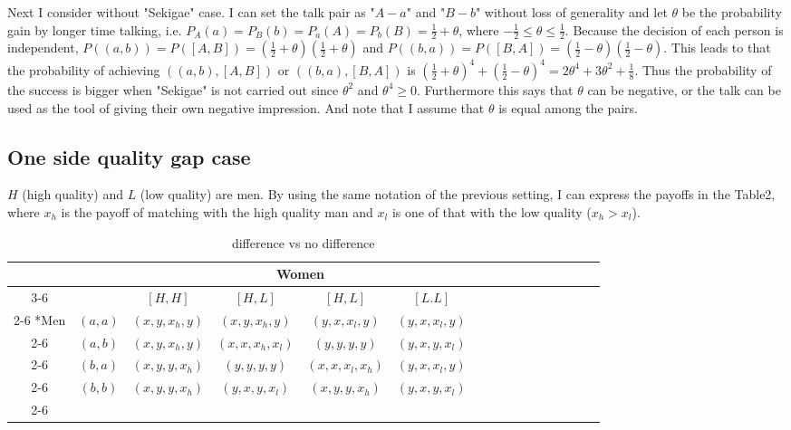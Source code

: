 \documentclass{article}
\begin{document}
	\par
	Next I consider without "Sekigae" case. I can set the talk pair as "$A - a$" and "$B - b$" without loss of generality and let $\theta$ be the probability gain by longer time talking, i.e. $P_A(a)= P_B(b) = P_a(A) = P_b(B) = \frac{1}{2} + \theta$, where $-\frac{1}{2} \leq\theta \leq \frac{1}{2}$. Because the decision of each person is independent, $P((a,b)) = P([A, B]) = \left( \frac{1}{2} + \theta \right) \left( \frac{1}{2} + \theta\right)$ and $P((b, a)) = P([B, A]) =  \left( \frac{1}{2} - \theta \right) \left( \frac{1}{2} - \theta\right)$. This leads to that the probability of achieving $\left( (a, b), [A, B] \right)$ or $\left( (b, a), [B, A] \right)$ is $ \left( \frac{1}{2} + \theta \right)^4 + \left( \frac{1}{2} - \theta\right)^4 = 2\theta^4 + 3\theta^2 + \frac{1}{8}$.
	Thus the probability of the success is bigger when "Sekigae" is not carried out since $\theta^2$ and $\theta^4 \geq 0$. Furthermore this says that $\theta$ can be negative, or the talk can be used as the tool of giving their own negative impression. And note that I assume that $\theta$ is equal among the pairs.

	\subsection{One side quality gap case}
	$H$ (high quality) and $L$ (low quality) are men. By using the same notation of the previous setting, I can express the payoffs in the Table2, where $x_h$ is the payoff of matching with the high quality man and $x_l$ is one of that with the low quality ($x_h > x_l$).
	
	\begin{table}[h]
		\begin{center}
                \setlength{\extrarowheight}{2pt}
                \begin{tabular}{*{16}{c|}}
                  \multicolumn{2}{c}{} & \multicolumn{1}{c}{} & \multicolumn{2}{c}{Women}\\\cline{3-6}
                  \multicolumn{1}{c}{} &  & $[H, H]$  & $[H, L]$ & $[H, L]$ & $[L.L]$\\\cline{2-6}
                  \multirow{4}*{Men}  & $(a,a)$ & $(x,y,x_h,y)$ & $(x,y,x_h,y)$ & $(y,x,x_l,y)$ & $(y,x,x_l,y)$\\\cline{2-6}
                  & $(a,b)$ & $(x,y,x_h,y)$ & $(x,x,x_h,x_l)$ & $(y,y,y,y)$ & $(y,x,y,x_l)$\\\cline{2-6}
                  & $(b,a)$ & $(x,y,y,x_h)$ & $(y,y,y,y)$ & $(x,x,x_l,x_h)$ & $(y,x,x_l,y)$\\\cline{2-6}
                  & $(b,b)$ & $(x,y,y,x_h)$ & $(y,x,y,x_l)$ & $(x,y,y,x_h)$ & $(y,x,y,x_l)$\\\cline{2-6}
                \end{tabular}
                \end{center}
                \caption{difference vs no difference}
          \end{table}
          
\end{document}
